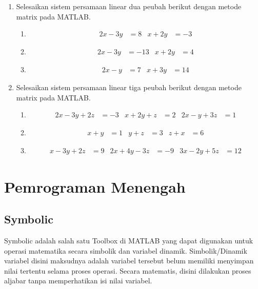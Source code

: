 \documentclass[12pt]{book}
\begin{document}
	\begin{enumerate}
		\item Selesaikan sistem persamaan linear dua peubah berikut dengan metode matrix pada MATLAB.
		\begin{enumerate}[label=(\alph*)]
			\item
			\begin{align*}
				2x-3y&=8 & x+2y&=-3
			\end{align*}

			\item
			\begin{align*}
				2x-3y&=-13 & x+2y&=4
			\end{align*}

			\item
			\begin{align*}
				2x-y&=7 & x+3y&=14
			\end{align*}
		\end{enumerate}

		\item Selesaikan sistem persamaan linear tiga peubah berikut dengan metode matrix pada MATLAB.
		\begin{enumerate}[label=(\alph*)]
			\item
			\begin{align*}
				2x-3y+2z&=-3 & x+2y+z&=2 & 2x-y+3z&=1
			\end{align*}

			\item
			\begin{align*}
				x+y&=1 & y+z&=3 & z+x&=6
			\end{align*}

			\item
			\begin{align*}
				x-3y+2z&=9 & 2x+4y-3z&=-9 & 3x-2y+5z&=12
			\end{align*}
		\end{enumerate}
	\end{enumerate}

	\newpage
	\chapter{Pemrograman Menengah}

	\section{Symbolic}

	Symbolic adalah salah satu Toolbox di MATLAB yang dapat digunakan untuk operasi matematika secara simbolik dan variabel dinamik.
	Simbolik/Dinamik variabel disini maksudnya adalah variabel tersebut belum memiliki menyimpan nilai tertentu selama proses operasi.
	Secara matematis, disini dilakukan proses aljabar tanpa memperhatikan isi nilai variabel.
\end{document}
